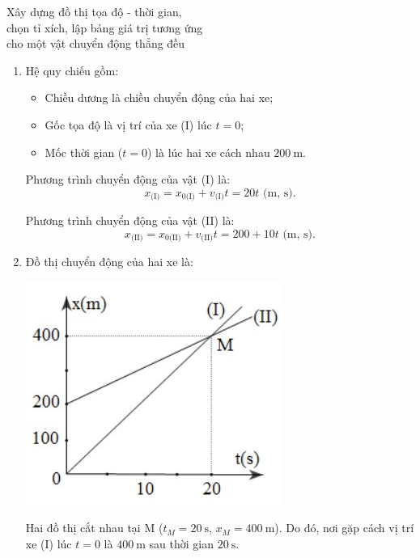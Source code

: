\begin{dang}{Xây dựng đồ thị tọa độ - thời gian,\\ chọn tỉ xích, lập bảng giá trị tương ứng \\cho một vật chuyển động thẳng đều}
{		
		\begin{enumerate}[label=\alph*)]
			\item
			Hệ quy chiếu gồm:
			\begin{itemize}
				\item Chiều dương là chiều chuyển động của hai xe;
				\item Gốc tọa độ là vị trí của xe (I) lúc $t=0$;
				\item Mốc thời gian ($t=0$) là lúc hai xe cách nhau $\SI{200}{\meter}$.
			\end{itemize}
			
			Phương trình chuyển động của vật (I) là:
			\begin{equation*}
				x_\text{(I)}=x_{0\text{(I)}} + v_\text{(I)}t =20t\textrm{ (m, s)}.
			\end{equation*}
			
			Phương trình chuyển động của vật (II) là:
			\begin{equation*}
				x_\text{(II)}=x_{0\text{(II)}} + v_\text{(II)}t = 200+10t\textrm{ (m, s)}.
			\end{equation*}
			\item
			Đồ thị chuyển động của hai xe là:
			\begin{center}
				\includegraphics[scale=0.8]{../figs/VN10-PH-03-L-002-4-V2-02.jpg}
			\end{center}
			Hai đồ thị cắt nhau tại M ($t_M=\SI{20}{\second}$, $x_M=\SI{400}{\meter}$). Do đó, nơi gặp cách vị trí xe (I) lúc $t=0$ là $\SI{400}{\meter}$ sau thời gian $\SI{20}{\second}$.
		\end{enumerate}	
	}
\end{dang}
